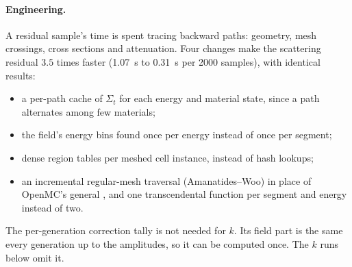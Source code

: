 \paragraph{Engineering.} A residual sample's time is spent tracing backward paths: geometry, mesh
crossings, cross sections and attenuation. Four changes make the scattering residual $3.5$ times
faster (1.07~s to 0.31~s per 2000 samples), with identical results:
\begin{itemize}
\item a per-path cache of $\Sigma_t$ for each energy and material state, since a path alternates
  among few materials;
\item the field's energy bins found once per energy instead of once per segment;
\item dense region tables per meshed cell instance, instead of hash lookups;
\item an incremental regular-mesh traversal (Amanatides--Woo) in place of OpenMC's general
  , and one transcendental function per segment and energy instead of two.
\end{itemize}
The per-generation correction tally is not needed for $k$. Its field part is the same every
generation up to the amplitudes, so it can be computed once. The $k$ runs below omit it.

\begin{table}[t]\centering\small
\caption{The iteration after the changes of this subsection, against the reference. The columns are:
the number of replicas; $\Delta k$ with its standard error, from 10-generation batch means pooled over
the replicas; $\overline{\Wabs}$; the per-generation spread of $k_n$; the active time per replica; and
the $k$ figure of merit relative to OpenMC (replica spread of the reference). Unless stated
otherwise, every run uses $N=2000$ per tag, $N_B=4\times10^4$, 40 inactive and 60 active
generations, and the combined cancellation.}\label{tab:sp:runs}
\setlength{\tabcolsep}{3.5pt}
\end{table}

